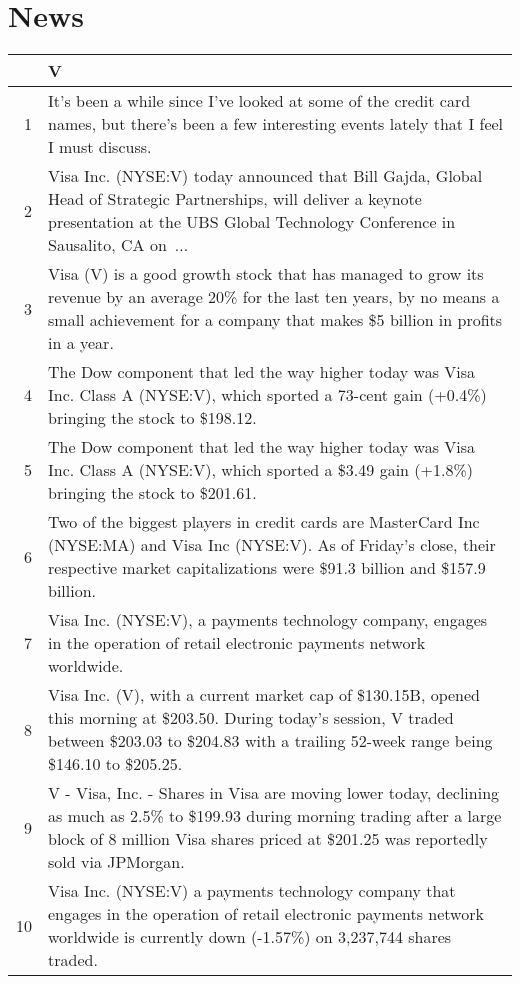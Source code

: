 \documentclass{tufte-handout}\usepackage[]{graphicx}\usepackage[]{color}
\begin{document}
\newpage
\section{News}


\begin{tabularx}{\textwidth}{rX}
  \hline
 & V \\ 
  \hline
1 &  It's been a while since I've looked at some of the credit card names, but there's been a few interesting events lately that I feel I must discuss.  \\ 
  2 &  Visa Inc. (NYSE:V) today announced that Bill Gajda, Global Head of Strategic Partnerships, will deliver a keynote presentation at the UBS Global Technology Conference in Sausalito, CA on ...  \\ 
  3 &  Visa (V) is a good growth stock that has managed to grow its revenue by an average 20\% for the last ten years, by no means a small achievement for a company that makes \$5 billion in profits in a year.  \\ 
  4 &  The Dow component that led the way higher today was Visa Inc. Class A (NYSE:V), which sported a 73-cent gain (+0.4\%) bringing the stock to \$198.12.  \\ 
  5 &  The Dow component that led the way higher today was Visa Inc. Class A (NYSE:V), which sported a \$3.49 gain (+1.8\%) bringing the stock to \$201.61.  \\ 
  6 &  Two of the biggest players in credit cards are MasterCard Inc (NYSE:MA) and Visa Inc (NYSE:V). As of Friday's close, their respective market capitalizations were \$91.3 billion and \$157.9 billion.  \\ 
  7 &  Visa Inc. (NYSE:V), a payments technology company, engages in the operation of retail electronic payments network worldwide.  \\ 
  8 &  Visa Inc. (V), with a current market cap of \$130.15B, opened this morning at \$203.50. During today's session, V traded between \$203.03 to \$204.83 with a trailing 52-week range being \$146.10 to \$205.25.  \\ 
  9 &  V - Visa, Inc. - Shares in Visa are moving lower today, declining as much as 2.5\% to \$199.93 during morning trading after a large block of 8 million Visa shares priced at \$201.25 was reportedly sold via JPMorgan.  \\ 
  10 &  Visa Inc. (NYSE:V) a payments technology company that engages in the operation of retail electronic payments network worldwide is currently down (-1.57\%) on 3,237,744 shares traded.  \\ 
   \hline
\end{tabularx}
\end{document}
